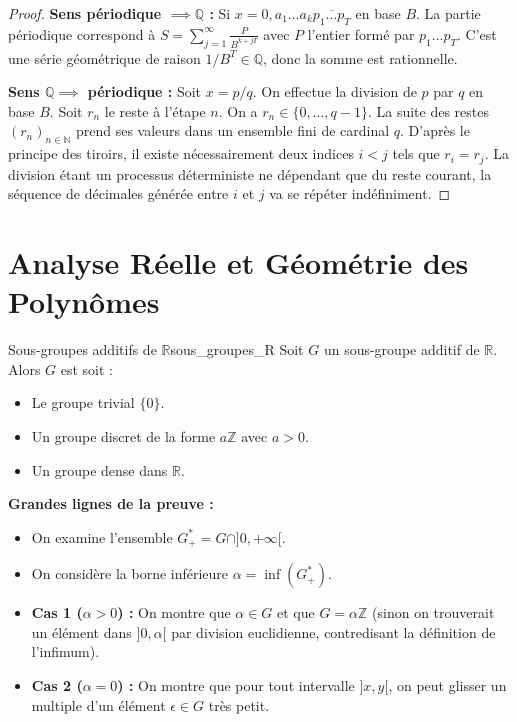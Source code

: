 \documentclass{prepacours}
\begin{document}
\begin{proof}
    \textbf{Sens périodique $\implies \mathbb{Q}$ :}
    Si $x = 0, a_1 \dots a_k \overline{p_1 \dots p_T}$ en base $B$.
    La partie périodique correspond à $S = \sum_{j=1}^\infty \frac{P}{B^{k+jT}}$ avec $P$ l'entier formé par $p_1\dots p_T$. C'est une série géométrique de raison $1/B^T \in \mathbb{Q}$, donc la somme est rationnelle.
    
    \textbf{Sens $\mathbb{Q} \implies$ périodique :}
    Soit $x = p/q$. On effectue la division de $p$ par $q$ en base $B$.
    Soit $r_n$ le reste à l'étape $n$. On a $r_n \in \{0, \dots, q-1\}$.
    La suite des restes $(r_n)_{n \in \mathbb{N}}$ prend ses valeurs dans un ensemble fini de cardinal $q$.
    D'après le principe des tiroirs, il existe nécessairement deux indices $i < j$ tels que $r_i = r_j$.
    La division étant un processus déterministe ne dépendant que du reste courant, la séquence de décimales générée entre $i$ et $j$ va se répéter indéfiniment.
\end{proof}

\section{Analyse Réelle et Géométrie des Polynômes}

\begin{proposition}{Sous-groupes additifs de $\mathbb{R}$}{sous_groupes_R}
    Soit $G$ un sous-groupe additif de $\mathbb{R}$. Alors $G$ est soit :
    \begin{itemize}
        \item Le groupe trivial $\{0\}$.
        \item Un groupe discret de la forme $a\mathbb{Z}$ avec $a > 0$.
        \item Un groupe dense dans $\mathbb{R}$.
    \end{itemize}
\end{proposition}

\noindent \textbf{Grandes lignes de la preuve :}
\begin{itemize}
    \item On examine l'ensemble $G_+^* = G \cap ]0, +\infty[$.
    \item On considère la borne inférieure $\alpha = \inf(G_+^*)$.
    \item \textbf{Cas 1 ($\alpha > 0$) :} On montre que $\alpha \in G$ et que $G = \alpha\mathbb{Z}$ (sinon on trouverait un élément dans $]0, \alpha[$ par division euclidienne, contredisant la définition de l'infimum).
    \item \textbf{Cas 2 ($\alpha = 0$) :} On montre que pour tout intervalle $]x, y[$, on peut glisser un multiple d'un élément $\epsilon \in G$ très petit.
\end{itemize}
\end{document}
